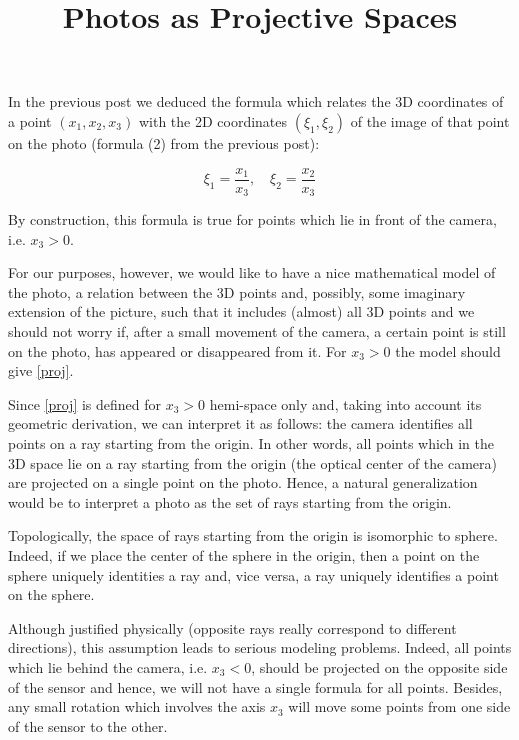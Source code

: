 \documentclass[a4paper,10pt]{article}
\title{Photos as Projective Spaces}
\author{}
\date{}
\begin{document}
\maketitle

In the previous post we deduced the formula which relates the 3D coordinates of a point $(x_1, x_2, x_3 )$ with the 2D coordinates $(\xi_1, \xi_2)$ of the image of that point on the photo (formula (2) from the previous post):

\begin{equation}
\xi_1 = \frac{x_1}{x_3}, \quad\xi_2 = \frac{x_2}{x_3}\label{proj}
\end{equation}


By construction, this formula is true for points which lie in front of the camera, i.e. $x_3>0$. 

For our purposes, however, we would like to have a nice mathematical model of the photo, a relation between the 3D points and, possibly, some imaginary extension of the picture, such that it includes (almost) all 3D points and we should not worry if, after a small movement of the camera, a certain point is still on the photo, has appeared or disappeared from it. For $x_3 > 0$ the model should give \eqref{proj}.

Since \eqref{proj} is defined for $x_3>0$ hemi-space only and, taking into account its geometric derivation, we can interpret it as follows: the camera identifies all points on a ray starting from the origin. In other words,  all points which in the 3D space lie on a ray starting from the origin (the optical center of the camera) are projected on a single point on the photo.  Hence, a natural generalization would be to interpret a photo as  the set of rays starting from the origin. 

Topologically, the space of rays starting from the origin is isomorphic to sphere. Indeed, if we place the center of the sphere in the origin, then a point on the sphere uniquely identities a ray and, vice versa, a ray uniquely identifies a point on the sphere. 

Although justified physically (opposite rays really correspond to different directions), this assumption leads to serious modeling problems. Indeed, all points which lie behind the camera, i.e. $x_3< 0$, should be projected on the opposite side of the sensor and hence, we will not have a single formula for all points. Besides, any small rotation which involves the axis $x_3$ will move some points from one side of the sensor to the other.
\end{document}
